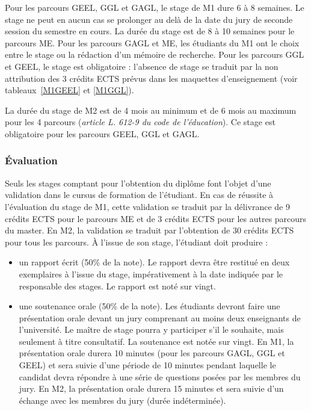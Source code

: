 \documentclass[a4paper,11pt]{article}
\begin{document}
Pour les parcours GEEL, GGL et GAGL, le stage de M1 dure 6 à 8 semaines. Le stage ne peut en aucun cas se prolonger au delà de la date du jury de seconde session du semestre en cours. La durée du stage est de 8 à 10 semaines pour le parcours ME. Pour les parcours GAGL et ME, les étudiants du M1 ont le choix entre le stage ou la rédaction d'un mémoire de recherche. Pour les parcours GGL et GEEL, le stage est obligatoire : l'absence de stage se traduit par la non attribution des 3 crédits ECTS prévus dans les maquettes d'enseignement (voir tableaux~\ref{M1GEEL} et \ref{M1GGL}).

La durée du stage de M2 est de 4 mois au minimum et de 6 mois au maximum pour les 4 parcours (\emph{article L. 612-9 du code de l'éducation}). Ce stage est obligatoire pour les parcours GEEL, GGL et GAGL.

\subsubsection{Évaluation}
Seuls les stages comptant pour l'obtention du diplôme font l'objet d'une validation dans le cursus de formation de l'étudiant. En cas de réussite à l'évaluation du stage de M1, cette validation se traduit par la délivrance de 9 crédits ECTS pour le parcours ME et de 3 crédits ECTS pour les autres parcours du master. En M2, la validation se traduit par l'obtention de 30 crédits ECTS pour tous les parcours. À l'issue de son stage, l'étudiant doit produire :
\begin{itemize}
	\item un rapport écrit (50\% de la note). Le rapport devra être restitué en deux exemplaires à l'issue du stage, impérativement à la date indiquée par le responsable des stages. Le rapport est noté sur vingt.
	\item une soutenance orale (50\% de la note). Les étudiants devront faire une présentation orale devant un jury comprenant au moins deux enseignants de l'université. Le maître de stage pourra y participer s'il le souhaite, mais seulement à titre consultatif. La soutenance est notée sur vingt. En M1, la présentation orale durera 10 minutes (pour les parcours GAGL, GGL et GEEL) et sera suivie d'une période de 10 minutes pendant laquelle le candidat devra répondre à une série de questions posées par les membres du jury. En M2, la présentation orale durera 15 minutes et sera suivie d'un échange avec les membres du jury (durée indéterminée).
\end{itemize}
\end{document}
